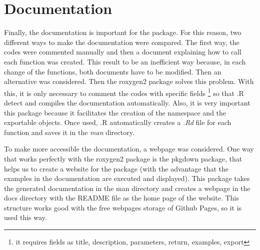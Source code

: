 \section{Documentation}
Finally, the documentation is important for the package. For this reason, two different ways to make the documentation were compared. The first way, the codes were commented manually and then a document explaining how to call each function was created. This result to be an inefficient way because, in each change of the functions, both documents have to be modified. Then an alternative was considered. Then the roxygen2 package \cite{wickham5roxygen2} solves this problem. With this, it is only necessary to comment the codes with specific fields \footnote{it requires fields as title, description, parameters, return, examples, export} so that .R detect and compiles the documentation automatically. Also, it is very important this package because it facilitates the creation of the namespace and the exportable objects. Once used, .R automatically creates a \textit{.Rd} file for each function and saves it in the \textit{man} directory. 

To make more accessible the documentation, a webpage was considered. One way that works perfectly with the roxygen2 package is the pkgdown package, that helps us to create a website for the package (with the advantage that the examples in the documentation are executed and displayed). This package takes the generated documentation in the man directory and creates a webpage in the docs directory with the README file as the home page of the website. This structure works good with the free webpages storage of Github Pages, so it is used this way.